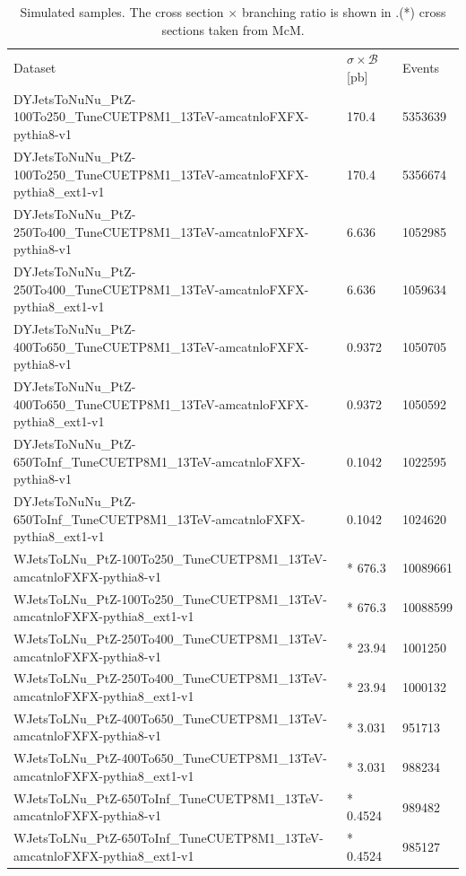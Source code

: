 \begin{table}[!htb]\centering
\caption{Simulated samples. The cross section $\times$ branching ratio is shown in \pb.\label{tab:bkg_datasets1} (*) cross sections taken from McM.}
\begin{tabular}{lll}
 \hline
 Dataset & $\sigma\times\mathcal{B}$ [pb] & Events \\
 
DYJetsToNuNu\_PtZ-100To250\_TuneCUETP8M1\_13TeV-amcatnloFXFX-pythia8-v1 & 170.4 & 5353639\\
DYJetsToNuNu\_PtZ-100To250\_TuneCUETP8M1\_13TeV-amcatnloFXFX-pythia8\_ext1-v1 & 170.4 & 5356674\\
DYJetsToNuNu\_PtZ-250To400\_TuneCUETP8M1\_13TeV-amcatnloFXFX-pythia8-v1 & 6.636 & 1052985\\
DYJetsToNuNu\_PtZ-250To400\_TuneCUETP8M1\_13TeV-amcatnloFXFX-pythia8\_ext1-v1 & 6.636 & 1059634\\
DYJetsToNuNu\_PtZ-400To650\_TuneCUETP8M1\_13TeV-amcatnloFXFX-pythia8-v1 & 0.9372 & 1050705\\
DYJetsToNuNu\_PtZ-400To650\_TuneCUETP8M1\_13TeV-amcatnloFXFX-pythia8\_ext1-v1 & 0.9372 & 1050592\\
DYJetsToNuNu\_PtZ-650ToInf\_TuneCUETP8M1\_13TeV-amcatnloFXFX-pythia8-v1 & 0.1042 & 1022595\\
DYJetsToNuNu\_PtZ-650ToInf\_TuneCUETP8M1\_13TeV-amcatnloFXFX-pythia8\_ext1-v1 & 0.1042 & 1024620\\
\hline
WJetsToLNu\_PtZ-100To250\_TuneCUETP8M1\_13TeV-amcatnloFXFX-pythia8-v1 & * 676.3 & 10089661\\
WJetsToLNu\_PtZ-100To250\_TuneCUETP8M1\_13TeV-amcatnloFXFX-pythia8\_ext1-v1 & * 676.3& 10088599\\
WJetsToLNu\_PtZ-250To400\_TuneCUETP8M1\_13TeV-amcatnloFXFX-pythia8-v1 & * 23.94 & 1001250\\
WJetsToLNu\_PtZ-250To400\_TuneCUETP8M1\_13TeV-amcatnloFXFX-pythia8\_ext1-v1 & * 23.94 & 1000132\\
WJetsToLNu\_PtZ-400To650\_TuneCUETP8M1\_13TeV-amcatnloFXFX-pythia8-v1 & * 3.031 & 951713\\
WJetsToLNu\_PtZ-400To650\_TuneCUETP8M1\_13TeV-amcatnloFXFX-pythia8\_ext1-v1 & * 3.031 & 988234\\
WJetsToLNu\_PtZ-650ToInf\_TuneCUETP8M1\_13TeV-amcatnloFXFX-pythia8-v1 & * 0.4524 & 989482\\
WJetsToLNu\_PtZ-650ToInf\_TuneCUETP8M1\_13TeV-amcatnloFXFX-pythia8\_ext1-v1 & * 0.4524 & 985127\\

\end{tabular}
\end{table}
